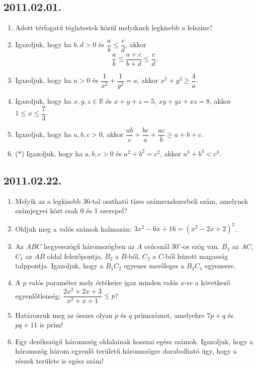 \subsection*{2011.02.01.}
\begin{enumerate}
\item Adott térfogatú téglatestek közül melyiknek legkisebb a felszíne?
\item Igazoljuk, hogy ha $b,d>0$ és $\dfrac{a}{b}\le \dfrac{c}{d}$, akkor
$$\dfrac{a}{b}\le\dfrac{a+c}{b+d}\le\dfrac{c}{d}.$$
\item Igazoljuk, hogy ha $a>0$ és $\dfrac{1}{x^2}+\dfrac{1}{y^2}=a$, akkor
$x^2+y^2\ge\dfrac{4}{a}$.
\item Igazoljuk, hogy ha $x,y,z\in\mathbb{R}$ és $x+y+z=5$, $xy+yz+xz=8$, akkor
$1\le x\le \dfrac{7}{3}$.
\item Igazoljuk, hogy ha $a,b,c>0$, akkor $\dfrac{ab}{c}+\dfrac{bc}{a}+\dfrac{ac}{b}\ge a+b+c$.
\item ($*$) Igazoljuk, hogy ha $a,b,c>0$ és $a^2+b^2=c^2$, akkor $a^3+b^3<c^3$.
\end{enumerate}

\subsection*{2011.02.22.}
\begin{enumerate}
\item Melyik az a legkisebb 36-tal osztható tízes számrendszerbeli szám, amelynek számjegyei közt csak 0 és 1 szerepel?
\item Oldjuk meg a valós számok halmazán: $3x^2-6x+16=(x^2-2x+2)^2$.
\item Az $ABC$ hegyesszögű háromszögben az $A$ csúcsnál $30^\circ$-os szög van. $B_1$ az $AC$, $C_1$ az $AB$ oldal felezőpontja, $B_2$ a $B$-ből, $C_2$ a $C$-ből húzott magasság talppontja. Igazoljuk, hogy a $B_1C_2$ egyenes merőleges a $B_2C_1$ egyenesre.
\item A $p$ valós paraméter mely értékeire igaz minden valós $x$-re a következő egyenlőtlenség: $\dfrac{2x^2+2x+3}{x^2+x+1}\le p$?
\item Határozzuk meg az összes olyan $p$ és $q$ prímszámot, amelyekre $7p+q$ és 
$pq+11$ is prím!
\item Egy derékszögű háromszög oldalainak hosszai egész számok. Igazoljuk, hogy a háromszög három egyenlő területű háromszögre darabolható úgy, hogy a részek területe is egész szám!
\end{enumerate}

